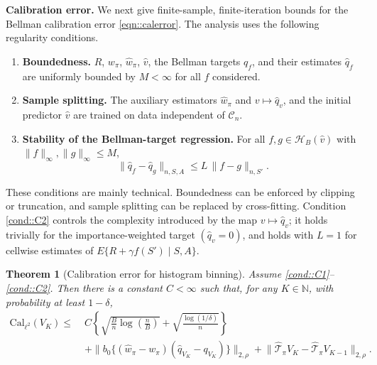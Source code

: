 \documentclass{article}
\theoremstyle{plain}
\newtheorem{theorem}{Theorem}
\theoremstyle{definition}
\theoremstyle{remark}
\begin{document}
 \textbf{Calibration error.}
We next give finite-sample, finite-iteration bounds for the Bellman calibration
error \eqref{eqn::calerror}. The analysis uses the following regularity
conditions.

\begin{enumerate}[label=\textbf{C\arabic*}, ref={C\arabic*}, leftmargin=1.5em, series=cond]

\item \label{cond::C1}
\textbf{Boundedness.}
\(R\), \(w_\pi\), \(\widehat w_\pi\), \(\hat v\), the Bellman targets \(q_f\),
and their estimates \(\hat q_f\) are uniformly bounded by \(M<\infty\) for all
\(f\) considered.

\item \label{cond::C1b}
\textbf{Sample splitting.}
The auxiliary estimators \(\widehat w_\pi\) and \(v\mapsto\hat q_v\), and the
initial predictor \(\hat v\) are trained on data independent of
\(\mathcal C_n\).

\item \label{cond::C2}
\textbf{Stability of the Bellman-target regression.}
For all \(f,g\in\mathcal H_B(\hat v)\) with
\(\|f\|_\infty,\|g\|_\infty\le M\),
\[
\|\hat q_f-\hat q_g\|_{n,S,A}
\le
L\,\|f-g\|_{n,S'} .
\]
\end{enumerate}

These conditions are mainly technical. Boundedness can be enforced by clipping
or truncation, and sample splitting can be replaced by cross-fitting. Condition
\ref{cond::C2} controls the complexity introduced by the map
\(v\mapsto\hat q_v\); it holds trivially for the importance-weighted target
\((\hat q_v=0)\), and holds with \(L=1\) for cellwise estimates of
\(E\{R+\gamma f(S')\mid S,A\}\).

\begin{theorem}[Calibration error for histogram binning]
\label{theorem::Calerrorhist}
Assume \ref{cond::C1}--\ref{cond::C2}. Then there is a constant
\(C<\infty\) such that, for any \(K\in\mathbb N\), with probability at least
\(1-\delta\),
\begin{align*}
\mathrm{Cal}_{\ell^2}(V_K)
\le\;&
C\left\{
\sqrt{\frac{B}{n}\log\!\left(\frac{n}{B}\right)}
+
\sqrt{\frac{\log(1/\delta)}{n}}
\right\} \\
&+
\big\|b_0\{(\widehat w_\pi-w_\pi)
(\widehat q_{V_K}-q_{V_K})\}\big\|_{2,\rho}  +
\big\|
\widehat{\mathcal T}_\pi V_K
-
\widehat{\mathcal T}_\pi V_{K-1}
\big\|_{2,\rho}.
\end{align*}
\end{theorem}
\end{document}
